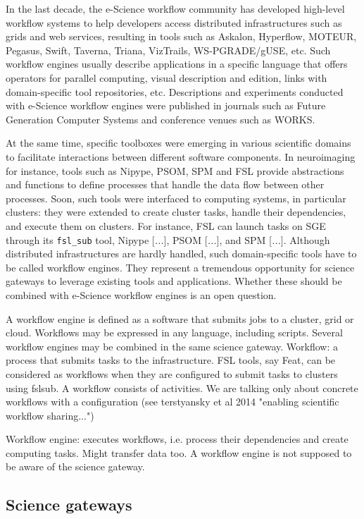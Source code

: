 \documentclass[preprint,3p,twocolumn]{elsarticle}
\newcommand{\todo}[1]{\color{blue}\xspace[\emph{#1}]\xspace\color{black}}
\begin{document}
In the last decade, the e-Science workflow community has developed
high-level workflow systems to help developers access distributed
infrastructures such as grids and web services, resulting in tools
such as Askalon, Hyperflow, MOTEUR, Pegasus, Swift, Taverna, Triana,
VizTrails, WS-PGRADE/gUSE, etc. Such workflow engines usually describe
applications in a specific language that offers operators for parallel
computing, visual description and edition, links with domain-specific
tool repositories, etc. Descriptions and experiments conducted with
e-Science workflow engines were published in journals such as Future
Generation Computer Systems and conference venues such as
WORKS. 

At the same time, specific toolboxes were emerging in various
scientific domains to facilitate interactions between different
software components. In neuroimaging for instance, tools such as
Nipype, PSOM, SPM and FSL provide abstractions and functions to define
processes that handle the data flow between other processes. Soon,
such tools were interfaced to computing systems, in particular
clusters: they were extended to create cluster tasks, handle their
dependencies, and execute them on clusters. For instance, FSL can
launch tasks on SGE through its \texttt{fsl\_sub} tool, Nipype
\todo{...}, PSOM \todo{...}, and SPM \todo{...}. Although distributed
infrastructures are hardly handled, such domain-specific tools have to
be called workflow engines. They represent a tremendous opportunity
for science gateways to leverage existing tools and
applications. Whether these should be combined with e-Science workflow
engines is an open question.

A workflow engine is defined as a software that submits jobs to a
cluster, grid or cloud. Workflows may be expressed in any language,
including scripts. Several workflow engines may be combined in the
same science gateway. Workflow: a process that submits tasks to the
infrastructure. FSL tools, say Feat, can be considered as workflows
when they are configured to submit tasks to clusters using fslsub. A
workflow consists of activities. We are talking only about concrete
workflows with a configuration (see terstyansky et al 2014 "enabling
scientific workflow sharing...")

  Workflow engine: executes workflows, i.e. process their dependencies
  and create computing tasks. Might transfer data too. A workflow
  engine is not supposed to be aware of the science gateway.

\subsection{Science gateways}
\end{document}
